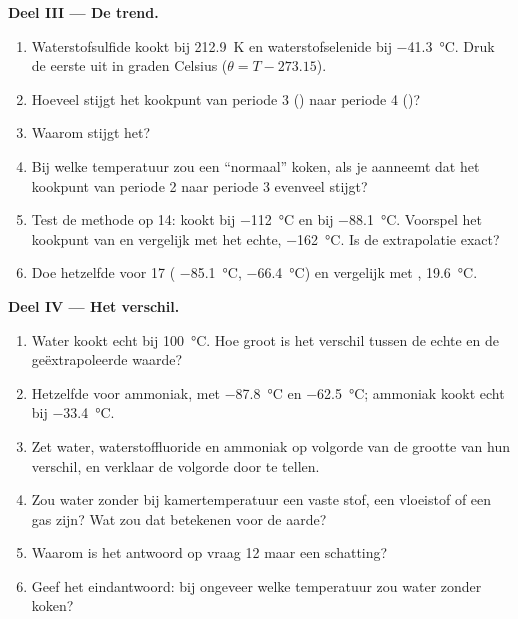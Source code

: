 \begin{problem}
\medskip
\noindent\textbf{Deel III --- De trend.}
\begin{enumerate}[resume]
  \item Waterstofsulfide kookt bij \qty{212.9}{K} en waterstofselenide
        bij \qty{-41.3}{\celsius}. Druk de eerste uit in graden Celsius
        ($\theta = T - 273.15$).
  \item Hoeveel stijgt het kookpunt van periode 3 () naar periode
        4 ()?
  \item Waarom stijgt het?
  \item Bij welke temperatuur zou een ``normaal''  koken, als je
        aanneemt dat het kookpunt van periode 2 naar periode 3 evenveel
        stijgt?
  \item Test de methode op  14:  kookt bij
        \qty{-112}{\celsius} en  bij \qty{-88.1}{\celsius}.
        Voorspel het kookpunt van  en vergelijk met het echte,
        \qty{-162}{\celsius}. Is de extrapolatie exact?
  \item Doe hetzelfde voor  17 ( \qty{-85.1}{\celsius},
         \qty{-66.4}{\celsius}) en vergelijk met ,
        \qty{19.6}{\celsius}.
\end{enumerate}

\medskip
\noindent\textbf{Deel IV --- Het verschil.}
\begin{enumerate}[resume]
  \item Water kookt echt bij \qty{100}{\celsius}. Hoe groot is het
        verschil tussen de echte en de geëxtrapoleerde waarde?
  \item Hetzelfde voor ammoniak, met  \qty{-87.8}{\celsius} en
         \qty{-62.5}{\celsius}; ammoniak kookt echt bij
        \qty{-33.4}{\celsius}.
  \item Zet water, waterstoffluoride en ammoniak op volgorde van de
        grootte van hun verschil, en verklaar de volgorde door
         te tellen.
  \item Zou water zonder  bij kamertemperatuur een vaste
        stof, een vloeistof of een gas zijn? Wat zou dat betekenen voor de
        aarde?
  \item Waarom is het antwoord op vraag 12 maar een schatting?
  \item Geef het eindantwoord: bij ongeveer welke temperatuur zou water
        zonder  koken?
\end{enumerate}
\end{problem}
